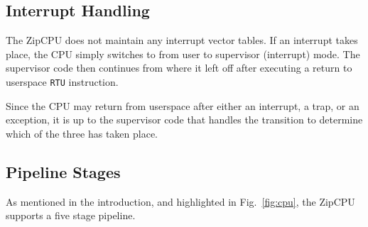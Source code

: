 \documentclass{gqtekspec}
\begin{document}
\subsection{Interrupt Handling}
The ZipCPU does not maintain any interrupt vector tables.  If an interrupt
takes place, the CPU simply switches to from user to supervisor (interrupt)
mode.  The supervisor code then continues from where it left off after 
executing a return to userspace {\tt RTU} instruction.

Since the CPU may return from userspace after either an interrupt, a
trap, or an exception, it is up to the supervisor code that handles the
transition to determine which of the three has taken place.

\subsection{Pipeline Stages}
As mentioned in the introduction, and highlighted in Fig.~\ref{fig:cpu},
the ZipCPU supports a five stage pipeline.
\end{document}
